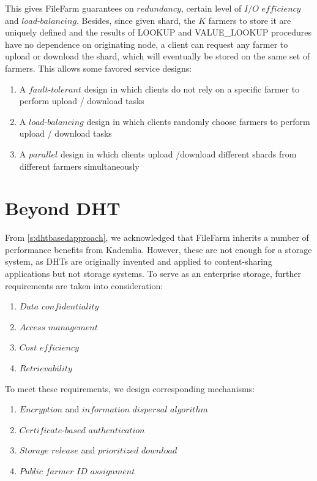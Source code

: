 This gives FileFarm guarantees on $redundancy$, certain level of $I/O$ $efficiency$ and $load$-$balancing$. Besides, since given shard, the $K$ farmers to store it are uniquely defined and the results of LOOKUP and VALUE\_LOOKUP procedures have no dependence on originating node, a client can request any farmer to upload or download the shard, which will eventually be stored on the same set of farmers. This allows some favored service designs:

\begin{enumerate}
  \item A $fault$-$tolerant$ design in which clients do not rely on a specific farmer to perform upload / download tasks
  \item A $load$-$balancing$ design in which clients randomly choose farmers to perform upload / download tasks
  \item A $parallel$ design in which clients upload /download different shards from different farmers simultaneously
\end{enumerate}

\section{Beyond DHT}
\label{s:beyonddht}

From \ref{s:dhtbasedapproach}, we acknowledged that FileFarm inherits a number of performance benefits from Kademlia. However, these are not enough for a storage system, as DHTs are originally invented and applied to content-sharing applications but not storage systems. To serve as an enterprise storage, further requirements are taken into consideration:

\begin{enumerate}
  \item $Data$ $confidentiality$
  \item $Access$ $management$
  \item $Cost$ $efficiency$
  \item $Retrievability$
\end{enumerate}

\noindent To meet these requirements, we design corresponding mechanisms:

\begin{enumerate}
  \item $Encryption$ and $information$ $dispersal$ $algorithm$
  \item $Certificate$-$based$ $authentication$
  \item $Storage$ $release$ and $prioritized$ $download$
  \item $Public$ $farmer$ $ID$ $assignment$
\end{enumerate}

